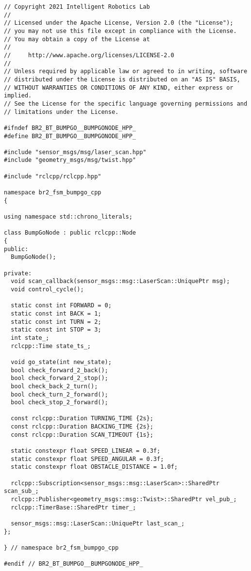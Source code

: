 \footnotesize
\begin{tcolorbox}[sharp corners, colframe=gray!80, colback=LightGray, left=0pt, top=0pt, bottom=0pt, title=\texttt{br2\_fsm\_bumpgo\_cpp/include/br2\_fsm\_bumpgo\_cpp/BumpGoNode.hpp}]
  \begin{verbatim}
// Copyright 2021 Intelligent Robotics Lab
//
// Licensed under the Apache License, Version 2.0 (the "License");
// you may not use this file except in compliance with the License.
// You may obtain a copy of the License at
//
//     http://www.apache.org/licenses/LICENSE-2.0
//
// Unless required by applicable law or agreed to in writing, software
// distributed under the License is distributed on an "AS IS" BASIS,
// WITHOUT WARRANTIES OR CONDITIONS OF ANY KIND, either express or implied.
// See the License for the specific language governing permissions and
// limitations under the License.

#ifndef BR2_BT_BUMPGO__BUMPGONODE_HPP_
#define BR2_BT_BUMPGO__BUMPGONODE_HPP_

#include "sensor_msgs/msg/laser_scan.hpp"
#include "geometry_msgs/msg/twist.hpp"

#include "rclcpp/rclcpp.hpp"

namespace br2_fsm_bumpgo_cpp
{

using namespace std::chrono_literals;

class BumpGoNode : public rclcpp::Node
{
public:
  BumpGoNode();

private:
  void scan_callback(sensor_msgs::msg::LaserScan::UniquePtr msg);
  void control_cycle();

  static const int FORWARD = 0;
  static const int BACK = 1;
  static const int TURN = 2;
  static const int STOP = 3;
  int state_;
  rclcpp::Time state_ts_;

  void go_state(int new_state);
  bool check_forward_2_back();
  bool check_forward_2_stop();
  bool check_back_2_turn();
  bool check_turn_2_forward();
  bool check_stop_2_forward();

  const rclcpp::Duration TURNING_TIME {2s};
  const rclcpp::Duration BACKING_TIME {2s};
  const rclcpp::Duration SCAN_TIMEOUT {1s};

  static constexpr float SPEED_LINEAR = 0.3f;
  static constexpr float SPEED_ANGULAR = 0.3f;
  static constexpr float OBSTACLE_DISTANCE = 1.0f;

  rclcpp::Subscription<sensor_msgs::msg::LaserScan>::SharedPtr scan_sub_;
  rclcpp::Publisher<geometry_msgs::msg::Twist>::SharedPtr vel_pub_;
  rclcpp::TimerBase::SharedPtr timer_;

  sensor_msgs::msg::LaserScan::UniquePtr last_scan_;
};

} // namespace br2_fsm_bumpgo_cpp

#endif // BR2_BT_BUMPGO__BUMPGONODE_HPP_
    \end{verbatim}
    \end{tcolorbox}
  \normalsize

